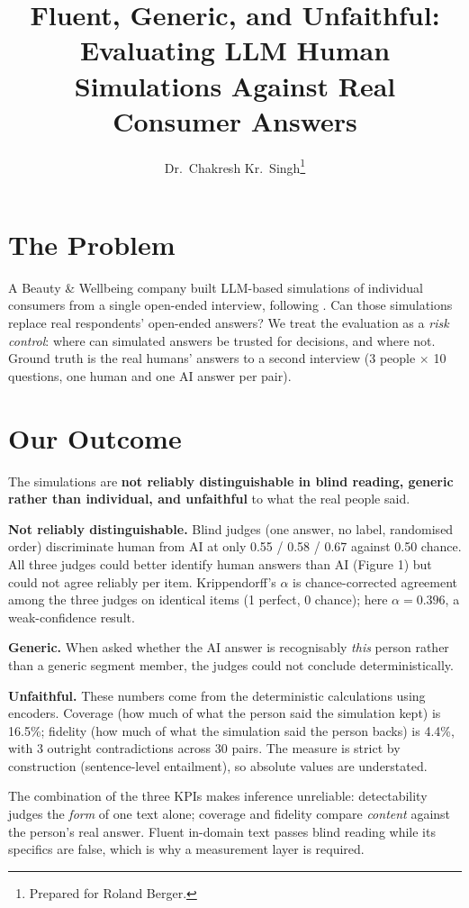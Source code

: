 \documentclass[10pt,twocolumn]{article}
\title{\large\bfseries Fluent, Generic, and Unfaithful: Evaluating LLM Human
Simulations Against Real Consumer Answers}
\author{\normalsize Dr.\ Chakresh Kr.\ Singh\thanks{Prepared for Roland Berger.}}
\date{}
\begin{document}
\maketitle

\section{The Problem}
A Beauty \& Wellbeing company built LLM-based simulations of individual
consumers from a single open-ended interview, following
\citet{park2024generative}. Can those simulations replace real respondents'
open-ended answers? We treat the evaluation as a \emph{risk control}: where
can simulated answers be trusted for decisions, and where not. Ground truth
is the real humans' answers to a second interview
(3 people $\times$ 10 questions, one human and one AI answer per pair).

\section{Our Outcome}
The simulations are \textbf{not reliably distinguishable in blind reading,
generic rather than individual, and unfaithful} to what the real people
said.

\textbf{Not reliably distinguishable.} Blind judges (one answer, no label,
randomised order) discriminate human from AI at only 0.55 / 0.58 / 0.67
against 0.50 chance. All three judges could better identify human answers than AI (Figure 1)
but could not agree reliably per item. Krippendorff's
$\alpha$ \citep{krippendorff2004content} is chance-corrected agreement
among the three judges on identical items (1 perfect, 0 chance); here
$\alpha = 0.396$, a weak-confidence result.

\textbf{Generic.} When asked whether the AI answer is recognisably \emph{this}
person rather than a generic segment member, the judges could not conclude deterministically.

\textbf{Unfaithful.} These numbers come from the deterministic calculations using encoders. Coverage (how much of what the person said the simulation
kept) is 16.5\%; fidelity (how much of what the simulation said the person
backs) is 4.4\%, with 3 outright contradictions across 30 pairs. The measure is strict by
construction (sentence-level entailment), so absolute values are
understated. 

The combination of the three KPIs makes inference unreliable: detectability judges the \emph{form} of one text alone; coverage and fidelity compare \emph{content} against the
person's real answer. Fluent in-domain text passes blind reading while its
specifics are false, which is why a measurement layer is required.
\end{document}
